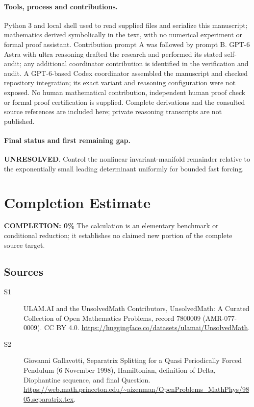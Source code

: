 \documentclass[11pt]{article}
\begin{document}
\paragraph{Tools, process and contributions.}
Python 3 and local shell used to read supplied files and serialize this manuscript; mathematics derived symbolically in the text, with no numerical experiment or formal proof assistant. Contribution prompt A was followed by prompt B. GPT-6 Astra with ultra reasoning drafted the research and performed its stated self-audit; any additional coordinator contribution is identified in the verification and audit. A GPT-6-based Codex coordinator assembled the manuscript and checked repository integration; its exact variant and reasoning configuration were not exposed. No human mathematical contribution, independent human proof check or formal proof certification is supplied. Complete derivations and the consulted source references are included here; private reasoning transcripts are not published.

\paragraph{Final status and first remaining gap.}
\textbf{UNRESOLVED}. Control the nonlinear invariant-manifold remainder relative to the exponentially small leading determinant uniformly for bounded fast forcing.

\section{Completion Estimate}
\noindent\textbf{COMPLETION: 0\%}
The calculation is an elementary benchmark or conditional reduction; it establishes no claimed new portion of the complete source target.

\subsection{Sources}
\begin{description}
\item[\hypertarget{source:7800009:1}{S1}] ULAM.AI and the UnsolvedMath Contributors, UnsolvedMath: A Curated Collection of Open Mathematics Problems, record 7800009 (AMR-077-0009). CC BY 4.0. \url{https://huggingface.co/datasets/ulamai/UnsolvedMath}.
\item[\hypertarget{source:7800009:2}{S2}] Giovanni Gallavotti, Separatrix Splitting for a Quasi Periodically Forced Pendulum (6 November 1998), Hamiltonian, definition of Delta, Diophantine sequence, and final Question. \url{https://web.math.princeton.edu/~aizenman/OpenProblems_MathPhys/9805.separatrix.tex}.
\end{description}
\label{end:7800009}
\end{document}
